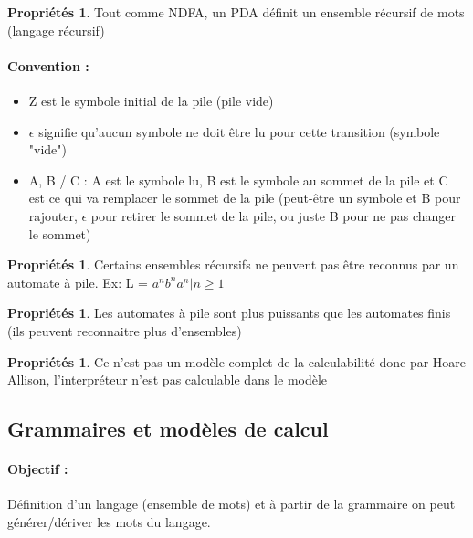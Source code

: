 \documentclass[11pt,a4paper]{article}
\theoremstyle{definition}
\newtheorem{myprop}[mydef]{Propriétés}
\begin{document}
\begin{myprop}
	Tout comme NDFA, un PDA définit un ensemble récursif de mots (langage 
	récursif)
\end{myprop}

\paragraph{Convention :} 
\begin{itemize}
	\item Z est le symbole initial de la pile (pile vide)
	\item $\epsilon$ signifie qu’aucun symbole ne doit être lu pour cette 
		transition (symbole "vide")
	\item A, B / C : A est le symbole lu, B est le symbole au 
		sommet de la pile et C est ce qui va remplacer le 
		sommet de la pile (peut-être un symbole et B pour 
		rajouter, $\epsilon$ pour retirer le sommet de la pile, 
		ou juste B pour ne pas changer le sommet)
\end{itemize}

\begin{myprop}
	Certains ensembles récursifs ne peuvent pas être reconnus par un automate 
	à pile. Ex: L = ${a^n b^n a^n | n\geq 1}$
\end{myprop}

\begin{myprop}
	Les automates à pile sont plus puissants que les automates finis (ils 
	peuvent reconnaitre plus d'ensembles)
\end{myprop}

\begin{myprop}
	Ce n'est pas un modèle complet de la calculabilité donc par Hoare 
	Allison, l'interpréteur n'est pas calculable dans le modèle
\end{myprop}


\subsection{Grammaires et modèles de calcul}
\label{sub:grammaires_et_mod_les_de_calcul}

\paragraph{Objectif :}
Définition d'un langage (ensemble de mots) et à partir de la grammaire on peut 
générer/dériver les mots du langage.
\end{document}
